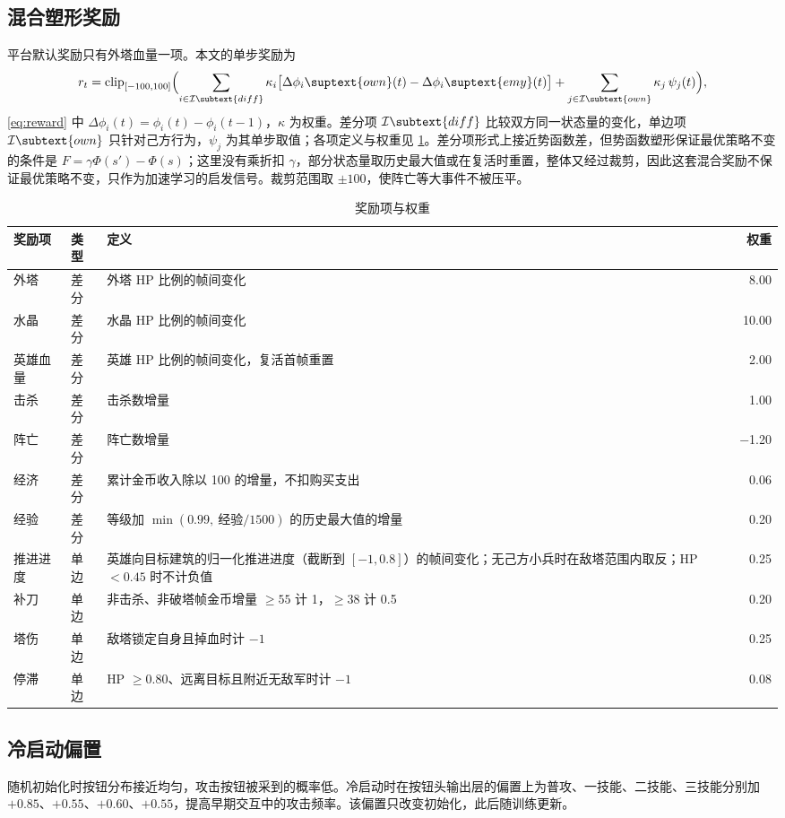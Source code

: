 \subsection{混合塑形奖励}
\label{sec:reward}

平台默认奖励只有外塔血量一项。本文的单步奖励为
\begin{equation}
  r_t=\operatorname{clip}_{[-100,100]}\Bigl(\sum_{i\in\mathcal I\subtext{diff}}\kappa_i\bigl[\Delta\phi_i\suptext{own}(t)-\Delta\phi_i\suptext{emy}(t)\bigr]+\sum_{j\in\mathcal I\subtext{own}}\kappa_j\,\psi_j(t)\Bigr),
  \label{eq:reward}
\end{equation}
\cref{eq:reward} 中 $\Delta\phi_i(t)=\phi_i(t)-\phi_i(t-1)$，$\kappa$ 为权重。差分项 $\mathcal I\subtext{diff}$ 比较双方同一状态量的变化，单边项 $\mathcal I\subtext{own}$ 只针对己方行为，$\psi_j$ 为其单步取值；各项定义与权重见 \cref{tab:reward}。差分项形式上接近势函数差，但势函数塑形保证最优策略不变的条件是 $F=\gamma\Phi(s')-\Phi(s)$\cite{ng1999}；这里没有乘折扣 $\gamma$，部分状态量取历史最大值或在复活时重置，整体又经过裁剪，因此这套混合奖励不保证最优策略不变，只作为加速学习的启发信号。裁剪范围取 $\pm100$，使阵亡等大事件不被压平。

\begin{table}[htbp]
  \centering
  \caption{奖励项与权重}
  \label{tab:reward}
  \begin{tabularx}{\linewidth}{llXr}
    \toprule
    奖励项 & 类型 & 定义 & 权重 \\
    \midrule
    外塔 & 差分 & 外塔 HP 比例的帧间变化 & \num{8.00} \\
    水晶 & 差分 & 水晶 HP 比例的帧间变化 & \num{10.00} \\
    英雄血量 & 差分 & 英雄 HP 比例的帧间变化，复活首帧重置 & \num{2.00} \\
    击杀 & 差分 & 击杀数增量 & \num{1.00} \\
    阵亡 & 差分 & 阵亡数增量 & \num{-1.20} \\
    经济 & 差分 & 累计金币收入除以 \num{100} 的增量，不扣购买支出 & \num{0.06} \\
    经验 & 差分 & 等级加 $\min(0.99,\ \text{经验}/1500)$ 的历史最大值的增量 & \num{0.20} \\
    推进进度 & 单边 & 英雄向目标建筑的归一化推进进度（截断到 $[-1,0.8]$）的帧间变化；无己方小兵时在敌塔范围内取反；HP $<0.45$ 时不计负值 & \num{0.25} \\
    补刀 & 单边 & 非击杀、非破塔帧金币增量 $\ge55$ 计 \num{1}，$\ge38$ 计 \num{0.5} & \num{0.20} \\
    塔伤 & 单边 & 敌塔锁定自身且掉血时计 $-1$ & \num{0.25} \\
    停滞 & 单边 & HP $\ge0.80$、远离目标且附近无敌军时计 $-1$ & \num{0.08} \\
    \bottomrule
  \end{tabularx}
\end{table}

\subsection{冷启动偏置}
\label{sec:prior}

随机初始化时按钮分布接近均匀，攻击按钮被采到的概率低。冷启动时在按钮头输出层的偏置上为普攻、一技能、二技能、三技能分别加 $+0.85$、$+0.55$、$+0.60$、$+0.55$，提高早期交互中的攻击频率。该偏置只改变初始化，此后随训练更新。
